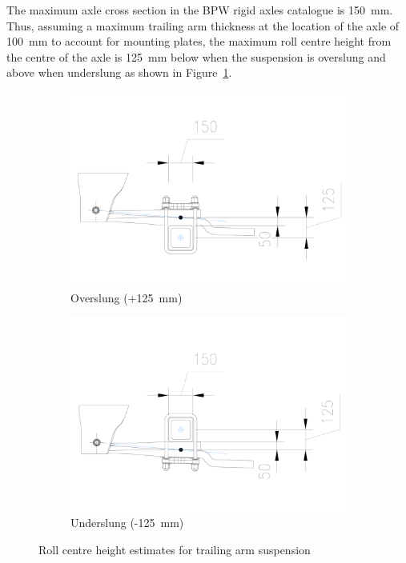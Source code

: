 The maximum axle cross section in the BPW rigid axles catalogue \cite{BPW2010} is 150~mm. Thus, assuming a maximum trailing arm thickness at the location of the axle of 100~mm to account for mounting plates, the maximum roll centre height from the centre of the axle is 125~mm below when the suspension is overslung and above when underslung as shown in Figure~\ref{figure:roll-centre-height-estimates-for-trailing-arm-suspension}.

\begin{figure}[!htbp]
	\centering
	\begin{subfigure}[t]{0.45\textwidth}
		\centering
		\includegraphics[width=1\textwidth]{fig/parameter-selection_roll-centre-height_overslung}
		\caption{Overslung (+125~mm)}
	\end{subfigure}\hfill
	\begin{subfigure}[t]{0.45\textwidth}
		\centering
		\includegraphics[width=1\textwidth]{fig/parameter-selection_roll-centre-height_underslung}
		\caption{Underslung (-125~mm)}
	\end{subfigure}

	\caption{Roll centre height estimates for trailing arm suspension}
	\label{figure:roll-centre-height-estimates-for-trailing-arm-suspension}
\end{figure}

